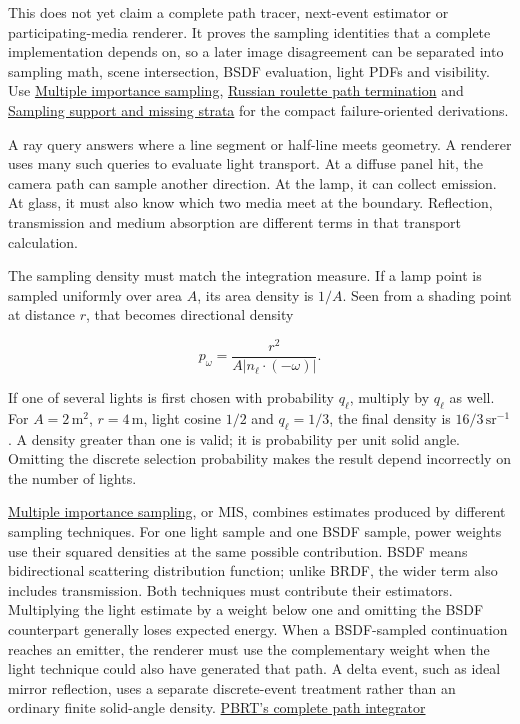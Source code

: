 This does not yet claim a complete path tracer, next-event estimator or participating-media renderer. It proves the sampling identities that a complete implementation depends on, so a later image disagreement can be separated into sampling math, scene intersection, BSDF evaluation, light PDFs and visibility. Use \hyperref[appendix-ca8898faf1a6]{Multiple importance sampling}, \hyperref[appendix-7277c62d4599]{Russian roulette path termination} and \hyperref[appendix-10308c3d753e]{Sampling support and missing strata} for the compact failure-oriented derivations.

A ray query answers where a line segment or half-line meets geometry. A renderer uses many such queries to evaluate light transport. At a diffuse panel hit, the camera path can sample another direction. At the lamp, it can collect emission. At glass, it must also know which two media meet at the boundary. Reflection, transmission and medium absorption are different terms in that transport calculation.

The sampling density must match the integration measure. If a lamp point is sampled uniformly over area \(A\), its area density is \(1/A\). Seen from a shading point at distance \(r\), that becomes directional density

\[
p_\omega=\frac{r^2}{A\lvert n_\ell\cdot(-\omega)\rvert}.
\]

If one of several lights is first chosen with probability \(q_\ell\), multiply by \(q_\ell\) as well. For \(A=2\,\mathrm{m^2}\), \(r=4\,\mathrm m\), light cosine \(1/2\) and \(q_\ell=1/3\), the final density is \(16/3\,\mathrm{sr}^{-1}\). A density greater than one is valid; it is probability per unit solid angle. Omitting the discrete selection probability makes the result depend incorrectly on the number of lights.

\hyperref[appendix-ca8898faf1a6]{Multiple importance sampling}, or MIS, combines estimates produced by different sampling techniques. For one light sample and one BSDF sample, power weights use their squared densities at the same possible contribution. BSDF means bidirectional scattering distribution function; unlike BRDF, the wider term also includes transmission. Both techniques must contribute their estimators. Multiplying the light estimate by a weight below one and omitting the BSDF counterpart generally loses expected energy. When a BSDF-sampled continuation reaches an emitter, the renderer must use the complementary weight when the light technique could also have generated that path. A delta event, such as ideal mirror reflection, uses a separate discrete-event treatment rather than an ordinary finite solid-angle density. \href{https://pbr-book.org/4ed/Light_Transport_I_Surface_Reflection/A_Better_Path_Tracer}{PBRT's complete path integrator}

